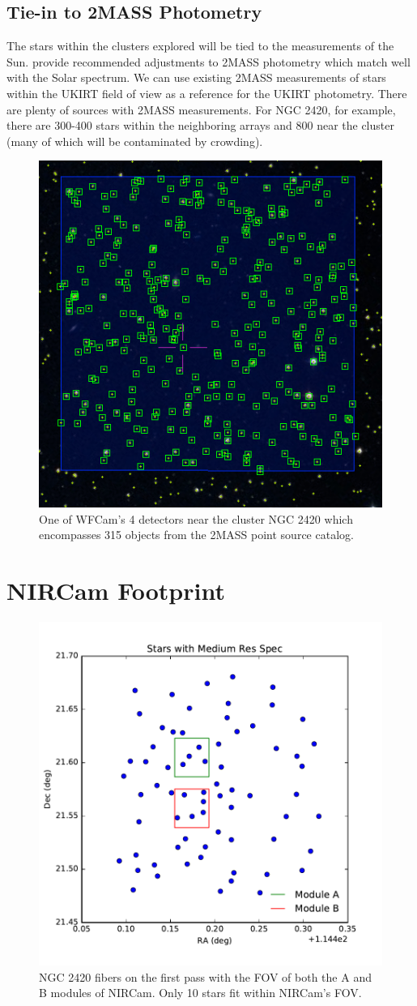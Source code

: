 \documentclass{aastex6}
\begin{document}
\subsection{Tie-in to 2MASS Photometry}

The stars within the clusters explored will be tied to the measurements of the Sun.
\citet{rieke2008absIRcal} provide recommended adjustments to 2MASS photometry which match well with the Solar spectrum.
We can use existing 2MASS measurements of stars within the UKIRT field of view as a reference for the UKIRT photometry.
There are plenty of sources with 2MASS measurements.
For NGC 2420, for example, there are 300-400 stars within the neighboring arrays and 800 near the cluster (many of which will be contaminated by crowding).

\begin{figure}[!hbtp]
\centering
\includegraphics[width=.4\columnwidth]{aladin_ngc2420_wfcam_square.png}
\caption{One of WFCam's 4 detectors near the cluster NGC 2420 which encompasses 315 objects from the 2MASS point source catalog.}\label{fig:wfcam3}
\end{figure}

\section{NIRCam Footprint}
\begin{figure}[!hbtp]
\centering
\includegraphics[width=.4\columnwidth]{nircam_fov_fibers.pdf}
\caption{NGC 2420 fibers on the first pass with the FOV of both the A and B modules of NIRCam.
Only 10 stars fit within NIRCam's FOV.}\label{fig:NCFOV}
\end{figure}
\end{document}

